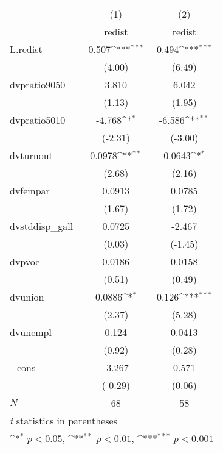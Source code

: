 {
\def\sym#1{\ifmmode^{#1}\else\(^{#1}\)\fi}
\begin{tabular}{l*{2}{c}}
\hline\hline
            &\multicolumn{1}{c}{(1)}&\multicolumn{1}{c}{(2)}\\
            &\multicolumn{1}{c}{redist}&\multicolumn{1}{c}{redist}\\
\hline
L.redist    &       0.507\sym{***}&       0.494\sym{***}\\
            &      (4.00)         &      (6.49)         \\
[1em]
dvpratio9050&       3.810         &       6.042         \\
            &      (1.13)         &      (1.95)         \\
[1em]
dvpratio5010&      -4.768\sym{*}  &      -6.586\sym{**} \\
            &     (-2.31)         &     (-3.00)         \\
[1em]
dvturnout   &      0.0978\sym{**} &      0.0643\sym{*}  \\
            &      (2.68)         &      (2.16)         \\
[1em]
dvfempar    &      0.0913         &      0.0785         \\
            &      (1.67)         &      (1.72)         \\
[1em]
dvstddisp\_gall&      0.0725         &      -2.467         \\
            &      (0.03)         &     (-1.45)         \\
[1em]
dvpvoc      &      0.0186         &      0.0158         \\
            &      (0.51)         &      (0.49)         \\
[1em]
dvunion     &      0.0886\sym{*}  &       0.126\sym{***}\\
            &      (2.37)         &      (5.28)         \\
[1em]
dvunempl    &       0.124         &      0.0413         \\
            &      (0.92)         &      (0.28)         \\
[1em]
\_cons      &      -3.267         &       0.571         \\
            &     (-0.29)         &      (0.06)         \\
\hline
\(N\)       &          68         &          58         \\
\hline\hline
\multicolumn{3}{l}{\footnotesize \textit{t} statistics in parentheses}\\
\multicolumn{3}{l}{\footnotesize \sym{*} \(p<0.05\), \sym{**} \(p<0.01\), \sym{***} \(p<0.001\)}\\
\end{tabular}
}
